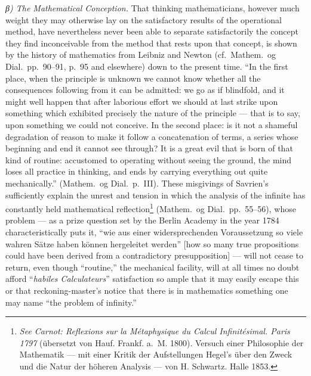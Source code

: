 \documentclass[12pt,a4paper]{book}
\begin{document}
\emph{β) The Mathematical Conception.} That thinking mathematicians, however
much weight they may otherwise lay on the satisfactory results of the
operational method, have nevertheless never been able to separate
satisfactorily the concept they find inconceivable from the method that rests
upon that concept, is shown by the history of mathematics from Leibniz and
Newton (cf.\ Mathem.\ og Dial.\ pp.~90--91, p.~95 and elsewhere) down to the
present time. ``In the first place, when the principle is unknown we cannot
know whether all the consequences following from it can be admitted: we go
\setcounter{footnote}{0}
as if blindfold, and it might well happen that after laborious effort we should
at last strike upon something which exhibited precisely the nature of the
principle --- that is to say, upon something we could not conceive. In the
second place: is it not a shameful degradation of reason to make it follow a
concatenation of terms, a series whose beginning and end it cannot see through?
It is a great evil that is born of that kind of routine: accustomed to
operating without seeing the ground, the mind loses all practice in thinking,
and ends by carrying everything out quite mechanically.'' (Mathem.\ og Dial.\
p.~III). These misgivings of Savrien's
sufficiently explain the unrest and tension in which the analysis of the
infinite has constantly held mathematical
reflection\footnote{\textit{See Carnot: Reflexions sur la Métaphysique du
Calcul Infinitésimal. Paris 1797} (übersetzt von Hauf. Frankf. a.~M. 1800).
Versuch einer Philosophie der Mathematik --- mit einer Kritik der Aufstellungen
Hegel's über den Zweck und die Natur der höheren Analysis --- von H. Schwartz.
Halle 1853.} (Mathem.\ og Dial.\ pp.~55--56), whose problem --- as a prize
question set by the Berlin Academy in the year 1784 characteristically puts it,
``wie aus einer widersprechenden Voraussetzung so viele wahren Sätze haben
können hergeleitet werden'' [how so many true propositions could have been
derived from a contradictory presupposition] --- will not cease to return, even
though ``routine,'' the mechanical facility, will at all times no doubt afford
``\textit{habiles Calculateurs}'' satisfaction so ample that it may easily
escape this or that reckoning-master's notice that there is in mathematics
something one may name ``the problem of infinity.''
\end{document}
